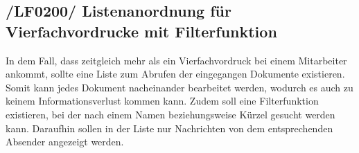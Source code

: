 \subsection{/LF0200/ Listenanordnung für Vierfachvordrucke mit Filterfunktion}
In dem Fall, dass zeitgleich mehr als ein Vierfachvordruck bei einem Mitarbeiter ankommt, sollte eine Liste zum Abrufen der eingegangen Dokumente existieren. Somit kann jedes Dokument nacheinander bearbeitet werden, wodurch es auch zu keinem Informationsverlust kommen kann. Zudem soll eine Filterfunktion existieren, bei der nach einem Namen beziehungsweise Kürzel gesucht werden kann. Daraufhin sollen in der Liste nur Nachrichten von dem entsprechenden Absender angezeigt werden.